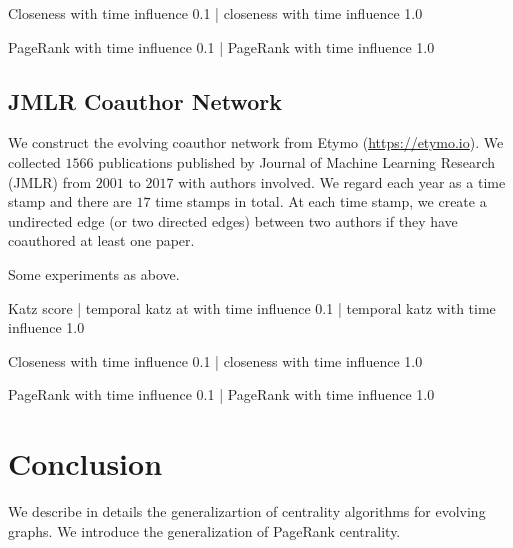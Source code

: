 \documentclass[12pt]{article}
\theoremstyle{definition}
\begin{document}
Closeness with time influence 0.1 | closeness with time influence 1.0


PageRank with time influence 0.1 | PageRank with time influence 1.0



\subsection{JMLR Coauthor Network}
\label{sec:jmlr-coauth-netw}

We construct the evolving coauthor network from Etymo (\url{https://etymo.io}).
We collected $1566$ publications published by Journal of Machine Learning Research (JMLR) from $2001$ to $2017$ with authors involved. We regard each year
as a time stamp and there are $17$ time stamps in total. At each time stamp, we
create a undirected edge (or two directed edges) between two authors if they have coauthored at least one paper.

Some experiments as above.

Katz score | temporal katz at with time influence 0.1 | temporal katz with time influence 1.0


Closeness with time influence 0.1 | closeness with time influence 1.0


PageRank with time influence 0.1 | PageRank with time influence 1.0



\section{Conclusion}
\label{sec:conclusion}

We describe in details the generalizartion of centrality algorithms for evolving graphs.
We introduce the generalization of PageRank centrality.



\end{document}
